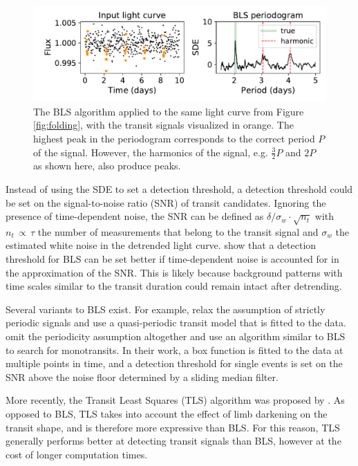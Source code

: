\begin{figure}
    \centering
    \includegraphics[width=0.6\linewidth]{Background/Figures/BLS_example.pdf}
    \caption{The BLS algorithm applied to the same light curve from Figure \ref{fig:folding}, with the transit signals visualized in orange. The highest peak in the periodogram corresponds to the correct period $P$ of the signal. However, the harmonics of the signal, e.g. $\frac{3}{2}P$ and $2P$ as shown here, also produce peaks.}
    \label{fig:bls_example}
\end{figure}

Instead of using the SDE to set a detection threshold, a detection threshold could be set on the signal-to-noise ratio (SNR) of transit candidates. Ignoring the presence of time-dependent noise, the SNR can be defined as $\delta / \sigma_w \cdot \sqrt{n_t}$ with $n_t \,\propto\, \tau$ the number of measurements that belong to the transit signal and $\sigma_w$ the estimated white noise in the detrended light curve. \cite{pont2006effect} show that a detection threshold for BLS can be set better if time-dependent noise is accounted for in the approximation of the SNR. This is likely because background patterns with time scales similar to the transit duration could remain intact after detrending.

Several variants to BLS exist. For example, \cite{carter2013quasiperiodic} relax the assumption of strictly periodic signals and use a quasi-periodic transit model that is fitted to the data. \cite{foreman2016population} omit the periodicity assumption altogether and use an algorithm similar to BLS to search for monotransits. In their work, a box function is fitted to the data at multiple points in time, and a detection threshold for single events is set on the SNR above the noise floor determined by a sliding median filter.

More recently, the Transit Least Squares (TLS) algorithm was proposed by \cite{hippke2019optimized}. As opposed to BLS, TLS takes into account the effect of limb darkening on the transit shape, and is therefore more expressive than BLS. For this reason, TLS generally performs better at detecting transit signals than BLS, however at the cost of longer computation times.

